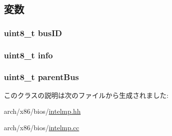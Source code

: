 \subsection{変数}
\hypertarget{classX86ISA_1_1IntelMP_1_1BusHierarchy_ac86b1934f811ad40b20b27d29c52a5d3}{
\subsubsection[{busID}]{\setlength{\rightskip}{0pt plus 5cm}uint8\_\-t {\bf busID}}}
\label{classX86ISA_1_1IntelMP_1_1BusHierarchy_ac86b1934f811ad40b20b27d29c52a5d3}
\hypertarget{classX86ISA_1_1IntelMP_1_1BusHierarchy_a3b5693c71298b922c6188573f2474227}{
\subsubsection[{info}]{\setlength{\rightskip}{0pt plus 5cm}uint8\_\-t {\bf info}}}
\label{classX86ISA_1_1IntelMP_1_1BusHierarchy_a3b5693c71298b922c6188573f2474227}
\hypertarget{classX86ISA_1_1IntelMP_1_1BusHierarchy_a41f801fc3a61f3e7791b38d67321b6f5}{
\subsubsection[{parentBus}]{\setlength{\rightskip}{0pt plus 5cm}uint8\_\-t {\bf parentBus}}}
\label{classX86ISA_1_1IntelMP_1_1BusHierarchy_a41f801fc3a61f3e7791b38d67321b6f5}


このクラスの説明は次のファイルから生成されました:\begin{DoxyCompactItemize}
\item 
arch/x86/bios/\hyperlink{intelmp_8hh}{intelmp.hh}\item 
arch/x86/bios/\hyperlink{intelmp_8cc}{intelmp.cc}\end{DoxyCompactItemize}
